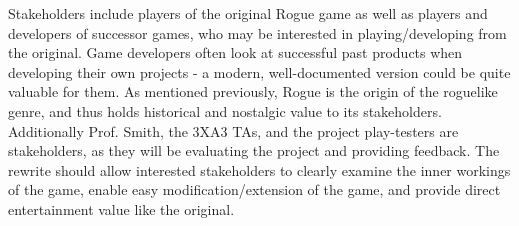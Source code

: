 \documentclass{article}
\begin{document}
Stakeholders include players of the original Rogue game as well as players and developers of successor games, who may be interested in playing/developing from the original. Game developers often look at successful past products when developing their own projects - a modern, well-documented version could be quite valuable for them. As mentioned previously, Rogue is the origin of the roguelike genre, and thus holds historical and nostalgic value to its stakeholders. Additionally Prof. Smith, the 3XA3 TAs, and the project play-testers are stakeholders, as they will be evaluating the project and providing feedback. The rewrite should allow interested stakeholders to clearly examine the inner workings of the game, enable easy modification/extension of the game, and provide direct entertainment value like the original.
\end{document}
